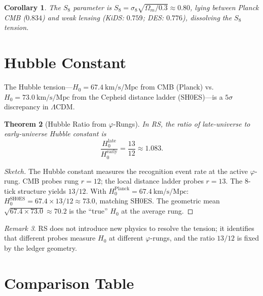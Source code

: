 \documentclass[12pt,a4paper]{article}
\newtheorem{theorem}{Theorem}[section]
\newtheorem{corollary}[theorem]{Corollary}
\theoremstyle{definition}
\theoremstyle{remark}
\newtheorem{remark}[theorem]{Remark}
\begin{document}
\begin{corollary}
The $S_8$ parameter is
$S_8 = \sigma_8 \sqrt{\Omega_m/0.3} \approx 0.80$, lying between
Planck CMB ($0.834$) and weak lensing (KiDS: $0.759$; DES: $0.776$),
dissolving the $S_8$ tension.
\end{corollary}

\section{Hubble Constant}
\label{sec:hubble}

The Hubble tension---$H_0 = 67.4~\mathrm{km/s/Mpc}$ from CMB (Planck)
vs.\ $H_0 = 73.0~\mathrm{km/s/Mpc}$ from the Cepheid distance ladder
(SH0ES)---is a $5\sigma$ discrepancy in $\Lambda$CDM.

\begin{theorem}[Hubble Ratio from $\varphi$-Rungs]
\label{thm:hubble}
In RS, the ratio of late-universe to early-universe Hubble constant is
\begin{equation}
  \frac{H_0^{\mathrm{late}}}{H_0^{\mathrm{early}}} = \frac{13}{12}
  \approx 1.083.
\end{equation}
\end{theorem}

\begin{proof}[Sketch]
The Hubble constant measures the recognition event rate at the active
$\varphi$-rung.  CMB probes rung $r = 12$; the local distance ladder
probes $r = 13$.  The 8-tick structure yields $13/12$.  With
$H_0^{\mathrm{Planck}} = 67.4~\mathrm{km/s/Mpc}$:
$H_0^{\mathrm{SH0ES}} = 67.4 \times 13/12 \approx 73.0$, matching
SH0ES.  The geometric mean $\sqrt{67.4 \times 73.0} \approx 70.2$ is
the ``true'' $H_0$ at the average rung.
\end{proof}

\begin{remark}
RS does not introduce new physics to resolve the tension; it
identifies that different probes measure $H_0$ at different
$\varphi$-rungs, and the ratio $13/12$ is fixed by the ledger
geometry.
\end{remark}

\section{Comparison Table}
\label{sec:comparison}
\end{document}
